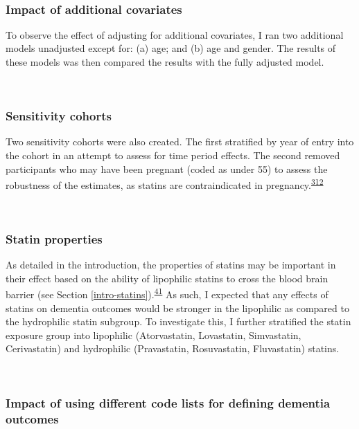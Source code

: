 \documentclass[a4paper, twoside]{templates/ociamthesis}
\begin{document}
~

\hypertarget{impact-of-additional-covariates}{%
\subsubsection{Impact of additional covariates}\label{impact-of-additional-covariates}}

To observe the effect of adjusting for additional covariates, I ran two additional models unadjusted except for: (a) age; and (b) age and gender. The results of these models was then compared the results with the fully adjusted model.

~

\hypertarget{sensitivity-cohorts}{%
\subsubsection{Sensitivity cohorts}\label{sensitivity-cohorts}}

Two sensitivity cohorts were also created. The first stratified by year of entry into the cohort in an attempt to assess for time period effects. The second removed participants who may have been pregnant (coded as under 55) to assess the robustness of the estimates, as statins are contraindicated in pregnancy.\textsuperscript{\protect\hyperlink{ref-karalis2016}{312}}

~

\hypertarget{statin-properties}{%
\subsubsection{Statin properties}\label{statin-properties}}

As detailed in the introduction, the properties of statins may be important in their effect based on the ability of lipophilic statins to cross the blood brain barrier (see Section \ref{intro-statins}).\textsuperscript{\protect\hyperlink{ref-sierra2011}{41}} As such, I expected that any effects of statins on dementia outcomes would be stronger in the lipophilic as compared to the hydrophilic statin subgroup. To investigate this, I further stratified the statin exposure group into lipophilic (Atorvastatin, Lovastatin, Simvastatin, Cerivastatin) and hydrophilic (Pravastatin, Rosuvastatin, Fluvastatin) statins.

~

\hypertarget{impact-of-using-different-code-lists-for-defining-dementia-outcomes}{%
\subsubsection{Impact of using different code lists for defining dementia outcomes}\label{impact-of-using-different-code-lists-for-defining-dementia-outcomes}}
\end{document}

